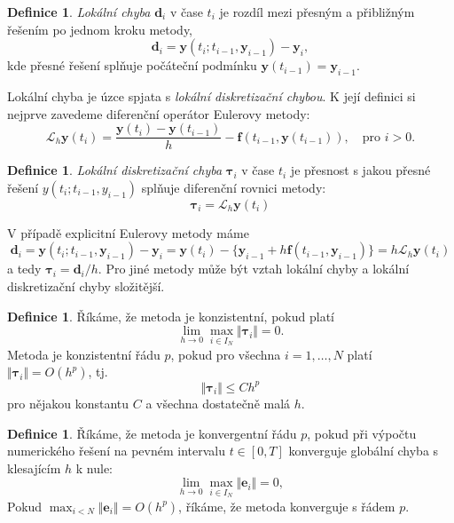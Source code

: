 \documentclass[a4paper, 12pt]{book}
\theoremstyle{definition}
\newtheorem{definition}[theorem]{Definice}
\def\to{\rightarrow}
\def\vc#1{\mathbf{\boldsymbol{#1}}}     %
\def\norm#1{\bigl\Vert#1\bigr\Vert} %
\def\df#1{\emph{#1}}
\begin{document}
\begin{definition}
 \df{Lokální chyba} $\vc d_i$ v čase $t_i$ je rozdíl mezi přesným a přibližným řešením po jednom kroku metody,
 \[
   \vc d_i = \vc y(t_i; t_{i-1}, \vc y_{i-1}) - \vc y_i,
 \]
kde přesné řešení splňuje počáteční podmínku $\vc y(t_{i-1}) = \vc y_{i-1}$. 
\end{definition}

Lokální chyba je úzce spjata s \df{lokální diskretizační chybou}. K její definici si nejprve zavedeme diferenční operátor Eulerovy metody:
\[
 \mathcal{L}_h \vc y(t_i) = \frac{\vc y(t_i) - \vc y(t_{i-1})}{h} - \vc f(t_{i-1}, \vc y(t_{i-1})), \quad \text{pro }i>0.
\]
\begin{definition}
 \df{Lokální diskretizační chyba} $\vc{\tau}_i$ v čase $t_i$ je přesnost s jakou přesné řešení 
 $y(t_i; t_{i-1}, y_{i-1})$ splňuje diferenční rovnici metody:
 \[
   \vc{\tau}_i = \mathcal{L}_h \vc y(t_i)
 \]
\end{definition}

V případě explicitní Eulerovy metody máme
\[
  \vc d_i = \vc y(t_i; t_{i-1}, \vc y_{i-1}) - \vc y_i = \vc y(t_i) - \Big\{\vc y_{i-1} + h \vc f(t_{i-1}, \vc y_{i-1})\Big\} = h\mathcal{L}_h \vc y(t_i) 
\]
a tedy $\vc \tau_i = \vc d_i/h$. Pro jiné metody může být vztah lokální chyby a lokální diskretizační chyby složitější.

\begin{definition}
 Říkáme, že metoda je konzistentní, pokud platí
 \[
   \lim_{h\to 0} \max_{i\in I_N} \norm{\vc \tau_i} = 0.
 \]
 Metoda je konzistentní řádu $p$, pokud pro všechna $i=1,\dots, N$ platí  $\norm{\vc\tau_i} = O (h^p)$, tj.
 \[
        \norm{\vc \tau_i} \le C h^p
 \]
pro nějakou konstantu $C$ a všechna dostatečně malá $h$.
\end{definition}

\begin{definition}
 Říkáme, že metoda je konvergentní řádu $p$, pokud při výpočtu numerického řešení na pevném intervalu $t \in [0,T]$ konverguje globální chyba
 s klesajícím $h$ k nule:
 \[
    \lim_{h\to 0} \max_{i\in I_N} \norm{\vc e_i} = 0,
 \]
 Pokud $\max_{i<N} \norm{\vc e_i} = O(h^p)$, říkáme, že metoda konverguje s řádem $p$.
\end{definition}
\end{document}
